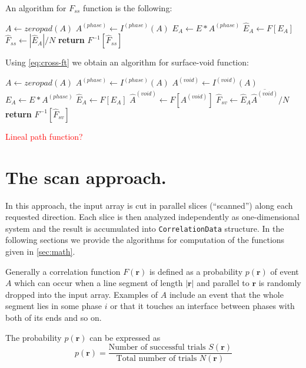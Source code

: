\documentclass[reprint,amsmath,amssymb,aps,pre,showkeys,showpacs,nofootinbib]{revtex4-1}
\newcommand{\code}[1]{\colorbox{light-gray}{\texttt{#1}}}
\begin{document}
An algorithm for $F_{ss}$ function is the following:
\begin{algorithmic}[1]
    \State $A \gets zeropad(A)$
  \EndIf
  \State $A^{(phase)} \gets I^{(phase)} (A)$
  \State $E_A \gets E * A^{(phase)}$
  \State $\hat{E}_A \gets F[E_A]$
  \State $\hat{F}_{ss} \gets |\hat{E}_A| / N$
  \State \textbf{return} $F^{-1} [\hat{F}_{ss}]$
  \EndProcedure
\end{algorithmic}

Using \cref{eq:cross-ft} we obtain an algorithm for surface-void function:
\begin{algorithmic}[1]
    \State $A \gets zeropad(A)$
  \EndIf
  \State $A^{(phase)} \gets I^{(phase)} (A)$
  \State $A^{(void)} \gets I^{(void)} (A)$
  \State $E_A \gets E * A^{(phase)}$
  \State $\hat{E}_A \gets F[E_A]$
  \State $\hat{A}^{(void)} \gets F[A^{(void)}]$
  \State $\hat{F}_{sv} \gets \hat{E}_A \overline{\hat{A}^{(void)}} / N$
  \State \textbf{return} $F^{-1} [\hat{F}_{sv}]$
  \EndProcedure
\end{algorithmic}

\textcolor{red}{Lineal path function?}

\section{The scan approach.}
\label{sec:scan}
In this approach, the input array is cut in parallel slices (``scanned'') along
each requested direction. Each slice is then analyzed independently as
one-dimensional system and the result is accumulated into \code{CorrelationData}
structure. In the following sections we provide the algorithms for computation
of the functions given in \cref{sec:math}.

Generally a correlation function $F(\bm{r})$ is defined as a probability
$p(\bm{r})$ of event $A$ which can occur when a line segment of length
$|\bm{r}|$ and parallel to $\bm{r}$ is randomly dropped into the input
array. Examples of $A$ include an event that the whole segment lies in some
phase $i$ or that it touches an interface between phases with both of its ends
and so on.

The probability $p(\bm{r})$ can be expressed as
\begin{equation}\label{eq:probability}
  p(\bm{r}) = \frac{\text{Number of successful trials $S(\bm{r})$}}
  {\text{Total number of trials $N(\bm{r})$}}
\end{equation}
\end{document}
